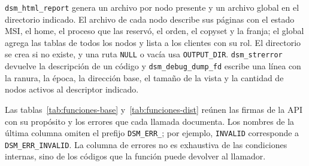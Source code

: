 \texttt{dsm\_html\_report} genera un archivo por nodo presente y un archivo global en el directorio indicado. El archivo de cada nodo describe sus páginas con el estado MSI, el home, el proceso que las reservó, el orden, el copyset y la franja; el global agrega las tablas de todos los nodos y lista a los clientes con su rol. El directorio se crea si no existe, y una ruta \texttt{NULL} o vacía usa \texttt{OUTPUT\_DIR}. \texttt{dsm\_strerror} devuelve la descripción de un código y \texttt{dsm\_debug\_dump\_fd} escribe una línea con la ranura, la época, la dirección base, el tamaño de la vista y la cantidad de nodos activos al descriptor indicado.

Las tablas~\ref{tab:funciones-base} y~\ref{tab:funciones-dist} reúnen las firmas de la API con su propósito y los errores que cada llamada documenta. Los nombres de la última columna omiten el prefijo \texttt{DSM\_ERR\_}; por ejemplo, \texttt{INVALID} corresponde a \texttt{DSM\_ERR\_INVALID}. La columna de errores no es exhaustiva de las condiciones internas, sino de los códigos que la función puede devolver al llamador.

